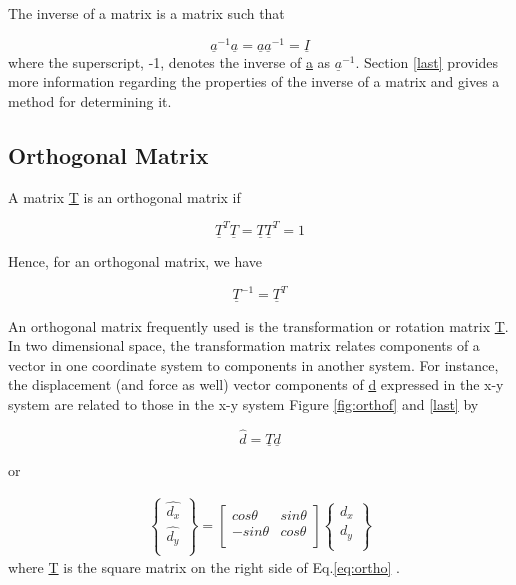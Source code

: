 \documentclass[12pt]{report}
\newcommand{\eref}[1]{
	Eq.\ref{#1}
}
\begin{document}
The inverse of a matrix is a matrix such that

\begin{equation}
	\underline{a}^{-1}\underline{a}=\underline{a}\underline{a}^{-1}=
	\underline{I}
\end{equation}
where the superscript, -1, denotes the inverse of \underline{a} 
as $\underline{a}^{-1}$. Section \ref{last} provides more 
information regarding the properties of the inverse of a 
matrix and gives a method for determining it.


\subsection{Orthogonal Matrix}

A matrix \underline{T} is an orthogonal matrix if

\begin{equation}
	\underline{T}^T\underline{T} = \underline{T}\underline{T}^T=1
\end{equation}

Hence, for an orthogonal matrix, we have

\begin{equation}
	\underline{T}^{-1}=\underline{T}^T
\end{equation}

An orthogonal matrix frequently used is the transformation or rotation
matrix \underline{T}. In two dimensional space, the transformation matrix
relates components of a vector in one coordinate system to components
in another system. For instance, the displacement (and force as well)
vector components of \underline{d} expressed in the x-y system are related to
those in the x-y system Figure \ref{fig:orthof} and \ref{last} by

\begin{equation}
	\hat{d}=\underline{T}\underline{d}
\end{equation}

or

\begin{eqnarray}
	\left\{\begin{array}{rr}
	\hat{d_{x}} \\
	\hat{d_{y}} \\
\end{array}\right\} = \left[\begin{array}{rr}
	cos\theta & sin\theta \\
	-sin\theta & cos\theta  \\
\end{array}\right]
	\left\{\begin{array}{rr}
	d_{x} \\
	d_{y} \\
\end{array}\right\}
	\label{eq:ortho}
\end{eqnarray}
where \underline{T} is the square matrix on the right side of \eref{eq:ortho}.
\end{document}
